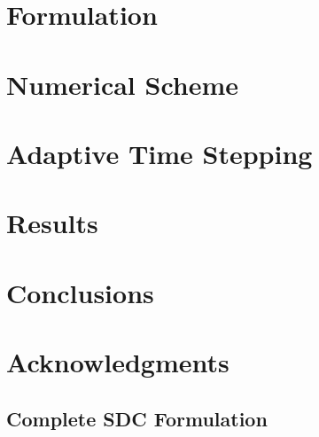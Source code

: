 \documentclass[preprint, 10pt]{elsarticle}
\begin{document}
\section{Formulation\label{s:formulation}} 


\section{Numerical Scheme\label{s:numerics}}


\section{Adaptive Time Stepping\label{s:adaptive}}


\section{Results\label{s:results}} 


\section{Conclusions\label{s:conclusions}} 


\section{Acknowledgments\label{s:acknowledgments}} 


\begin{appendices}

\section{Complete SDC Formulation \label{a:appendix1}}


\end{appendices}



 

\end{document}
